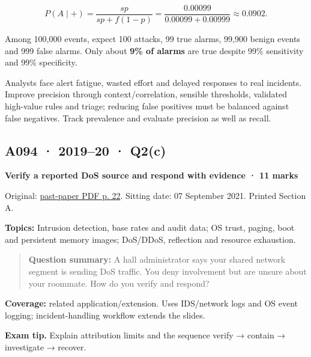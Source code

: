 \documentclass[11pt,a4paper]{article}
\begin{document}
\[
P(A\mid +)=\frac{sp}{sp+f(1-p)}=\frac{0.00099}{0.00099+0.00999}\approx 0.0902.
\]

Among 100,\allowbreak{}000 events,\allowbreak{} expect 100 attacks,\allowbreak{} 99 true alarms,\allowbreak{} 99,\allowbreak{}900 benign events and 999 false alarms. Only about \textbf{9\% of alarms} are true despite 99\% sensitivity and 99\% specificity.


Analysts face alert fatigue,\allowbreak{} wasted effort and delayed responses to real incidents. Improve precision through context/\allowbreak{}correlation,\allowbreak{} sensible thresholds,\allowbreak{} validated high-value rules and triage; reducing false positives must be balanced against false negatives. Track prevalence and evaluate precision as well as recall.




\clearpage
\subsection{A094 · 2019–20 · Q2(c)}\label{a094}

\textbf{Verify a reported DoS source and respond with evidence · 11 marks}


Original: \href{../../CSE405-Security_Merged.pdf\#page=22}{past-paper PDF p. 22}. Sitting date: 07 September 2021. Printed Section A.


\textbf{Topics:} Intrusion detection,\allowbreak{} base rates and audit data; OS trust,\allowbreak{} paging,\allowbreak{} boot and persistent memory images; DoS/\allowbreak{}DDoS,\allowbreak{} reflection and resource exhaustion.



\begin{quote}\small

\textbf{Question summary:} A hall administrator says your shared network segment is sending DoS traffic. You deny involvement but are unsure about your roommate. How do you verify and respond?



\end{quote}

\textbf{Coverage:} related application/\allowbreak{}extension. Uses IDS/\allowbreak{}network logs and OS event logging; incident-handling workflow extends the slides.



{\color{ForestGreen}\textbf{Exam tip.} Explain attribution limits and the sequence verify → contain → investigate → recover.}
\end{document}
